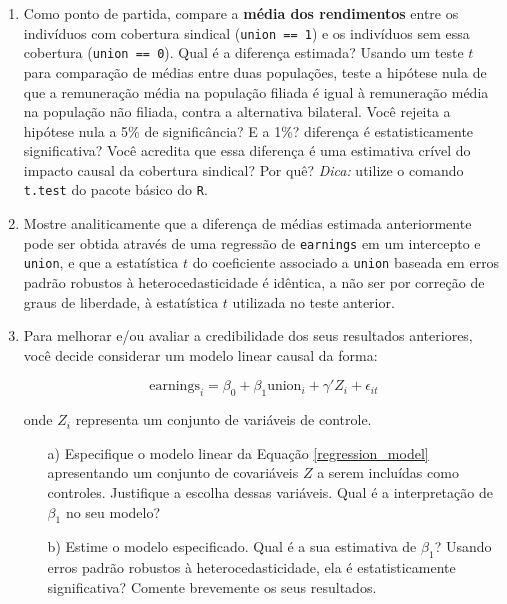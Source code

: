 \documentclass[10pt,a4paper]{article}
\begin{document}
 \begin{enumerate}
 	
 	\item Como ponto de partida, compare a \textbf{média dos rendimentos} entre os indivíduos com cobertura sindical (\texttt{union == 1}) e os indivíduos sem essa cobertura (\texttt{union == 0}). Qual é a diferença estimada? Usando um teste $t$ para comparação de médias entre duas populações, teste a hipótese nula de que a remuneração média na população filiada é igual à remuneração média na população não filiada, contra a alternativa bilateral. Você rejeita a hipótese nula a 5\% de significância? E a 1\%?  diferença é estatisticamente significativa? Você acredita que essa diferença é uma estimativa crível do impacto causal da cobertura sindical? Por quê? \textit{Dica:} utilize o comando \texttt{t.test} do pacote básico do \texttt{R}.
 	
 	\item Mostre analiticamente que a diferença de médias estimada anteriormente pode ser obtida através de uma regressão de \texttt{earnings} em um intercepto e \texttt{union}, e que a estatística $t$ do coeficiente associado a \texttt{union} baseada em erros padrão robustos à heterocedasticidade é idêntica, a não ser por correção de graus de liberdade, à estatística $t$ utilizada no teste anterior. 
 	
 	\item Para melhorar e/ou avaliar a credibilidade dos seus resultados anteriores, você decide considerar um modelo linear causal da forma:
 	
 	\begin{equation}
 		\label{regression_model}
 		\text{earnings}_i = \beta_0 + \beta_1 \text{union}_i + \gamma'Z_i + \epsilon_{it}
 	\end{equation}
 	
 	onde $Z_i$ representa um conjunto de variáveis de controle.
 	
 	\begin{enumerate}
 		\item[a)] Especifique o modelo linear da Equação \eqref{regression_model} apresentando um conjunto de covariáveis $Z$ a serem incluídas como controles. Justifique a escolha dessas variáveis. Qual é a interpretação de $\beta_1$ no seu modelo?
 		
 		\item[b)] Estime o modelo especificado. Qual é a sua estimativa de $\beta_1$? Usando erros padrão robustos à heterocedasticidade, ela é estatisticamente significativa? Comente brevemente os seus resultados.
 		


\end{enumerate}
\end{enumerate}
\end{document}
